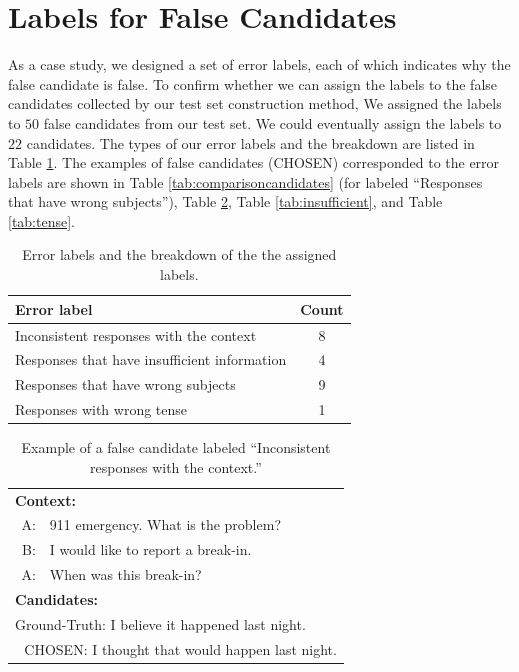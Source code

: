 \documentclass[11pt,a4paper]{article}
\begin{document}
%
%
\section{Labels for False Candidates}
\label{sec:labels}
As a case study, we designed a set of error labels, each of which indicates why the false candidate is false.
To confirm whether we can assign the labels to the false candidates collected by our test set construction method, We assigned the labels to $50$ false candidates from our test set.
We could eventually assign the labels to $22$ candidates.
The types of our error labels and the breakdown are listed in Table \ref{tab:breakdown}.
The examples of false candidates (CHOSEN) corresponded to the error labels are shown in Table \ref{tab:comparisoncandidates} (for labeled ``Responses that have wrong subjects''), Table \ref{tab:inconsistent}, Table \ref{tab:insufficient}, and Table \ref{tab:tense}.
%
%
%


\begin{table}[h]
\centering
\small
\begin{tabular}{lc} 
\toprule
Error label & Count \\
\midrule
Inconsistent responses with the context              & 8 \\
Responses that have insufficient information      & 4     \\
Responses that have wrong subjects   & 9     \\
Responses with wrong tense & 1 \\ 
\bottomrule
\end{tabular}
\caption{Error labels and the breakdown of the the assigned labels.}
\label{tab:breakdown}
\end{table}


\begin{table}[!h]
    \centering
    \small
    \begin{tabular}{rp{40ex}}
        \toprule
        \multicolumn{2}{l}{\textbf{Context:}} \\
        A: & 911 emergency. What is the problem?\\
        \rule{0pt}{2.5ex}
        B: & I would like to report a break-in.   \\
        \rule{0pt}{2.5ex}
        A: & When was this break-in?  \\
        \midrule
        \multicolumn{2}{l}{\textbf{Candidates:}} \\
        \multicolumn{2}{l}{Ground-Truth: I believe it happened last night.}  \\
        \multicolumn{2}{l}{\quad\,\, CHOSEN: I thought that would happen last night. } \\
        \bottomrule
    \end{tabular}
    \caption{Example of a false candidate labeled ``Inconsistent responses with the context.''}
    \label{tab:inconsistent}
\end{table}
\end{document}
